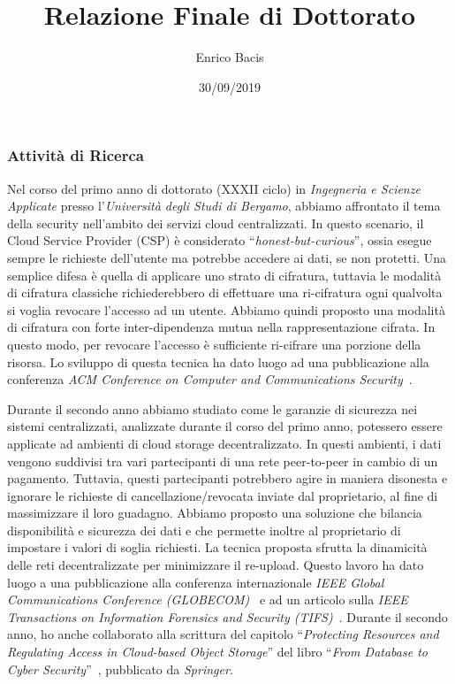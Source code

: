 \documentclass{article}
\begin{document}
\title{Relazione Finale di Dottorato}
\author{Enrico Bacis}
\date{30/09/2019}

\maketitle

\vspace{40px}

\subsubsection*{Attività di Ricerca}

Nel corso del primo anno di dottorato (XXXII ciclo) in {\em Ingegneria e Scienze Applicate} presso l'{\em Università degli Studi di Bergamo}, abbiamo affrontato il tema della security nell'ambito dei servizi cloud centralizzati. In questo scenario, il Cloud Service Provider (CSP) è considerato ``{\em honest-but-curious}'', ossia esegue sempre le richieste dell'utente ma potrebbe accedere ai dati, se non protetti. Una semplice difesa è quella di applicare uno strato di cifratura, tuttavia le modalità di cifratura classiche richiederebbero di effettuare una ri-cifratura ogni qualvolta si voglia revocare l'accesso ad un utente. Abbiamo quindi proposto una modalità di cifratura con forte inter-dipendenza mutua nella rappresentazione cifrata. In questo modo, per revocare l'accesso è sufficiente ri-cifrare una porzione della risorsa. Lo sviluppo di questa tecnica ha dato luogo ad una pubblicazione alla conferenza {\em ACM Conference on Computer and Communications Security}~\cite{ccs}.

\medskip
\noindent Durante il secondo anno abbiamo studiato come le garanzie di sicurezza nei sistemi centralizzati, analizzate durante il corso del primo anno, potessero essere applicate ad ambienti di cloud storage decentralizzato. In questi ambienti, i dati vengono suddivisi tra vari partecipanti di una rete peer-to-peer in cambio di un pagamento. Tuttavia, questi partecipanti potrebbero agire in maniera disonesta e ignorare le richieste di cancellazione/revocata inviate dal proprietario, al fine di massimizzare il loro guadagno.
Abbiamo proposto una soluzione che bilancia disponibilità e sicurezza dei dati e che permette inoltre al proprietario di impostare i valori di soglia richiesti. La tecnica proposta sfrutta la dinamicità delle reti decentralizzate per minimizzare il re-upload.
Questo lavoro ha dato luogo a una pubblicazione alla conferenza internazionale {\em  IEEE Global Communications Conference (GLOBECOM)}~\cite{globecom} e ad un articolo sulla {\em IEEE Transactions on Information Forensics and Security (TIFS)}~\cite{tifs}.
Durante il secondo anno, ho anche collaborato alla scrittura del capitolo ``{\em Protecting Resources and Regulating Access in Cloud-based Object Storage}'' del libro ``{\em From Database to Cyber Security}''~\cite{sushil}, pubblicato da {\em Springer}.
\end{document}
